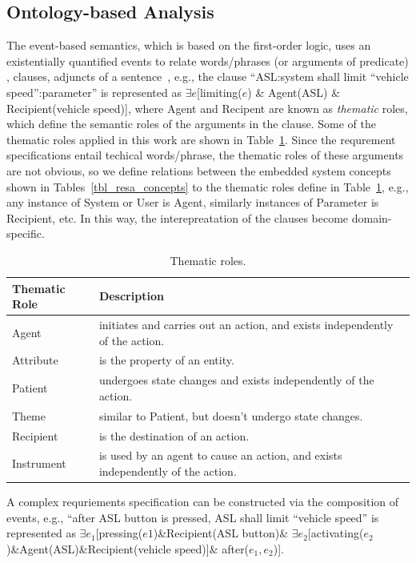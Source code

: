 \subsection{Ontology-based Analysis}
The event-based semantics, which is based on the first-order logic, uses an existentially quantified events to relate words/phrases (or arguments of predicate) , clauses, adjuncts of a sentence~\cite{Mahmud2017SpecificationLogic}, e.g., the clause ``ASL:system shall limit ``vehicle speed'':parameter'' is represented as $\exists e$[limiting($e$) \& Agent(ASL) \& Recipient(vehicle speed)], where Agent and Recipent are known as \textit{thematic} roles, which define the semantic roles of the arguments in the clause.  Some of the thematic roles applied in this work are shown in Table~\ref{tbl_thematic_roles}. Since the requrement specifications entail techical words/phrase, the thematic roles of these arguments are not obvious, so we define relations between the embedded system concepts shown in Tables~\ref{tbl_resa_concepts} to the thematic roles define in Table~\ref{tbl_thematic_roles}, e.g., any instance of System or User is Agent, similarly instances of Parameter is Recipient, etc. In this way, the interepreatation of the clauses become domain-specific.
\begin{table}[h]\small
	\begin{tabular}{@{}lp{}@{}}
		\toprule
		Thematic Role & Description \\ \midrule
		Agent & initiates and carries out an action, and exists independently of the action. \\
		Attribute & is the property of an entity. \\
		Patient & undergoes state changes and exists independently of the action. \\
		Theme & similar to Patient, but doesn't undergo state changes. \\
		Recipient & is the destination of an action. \\
		Instrument & is used by an agent to cause an action, and exists independently of the action. \\ \bottomrule
	\end{tabular}
\caption{Thematic roles.}\label{tbl_thematic_roles}
\end{table}

A complex requriements specification can be constructed via the composition of events, e.g., ``after ASL button is pressed, ASL shall limit ``vehicle speed'' is represented as $\exists e_1$[pressing($e1$)\&Recipient(ASL button)\& $\exists e_2$[activating($e_2$)\&Agent(ASL)\&Recipient(vehicle speed)]\& after($e_1,e_2$)].

